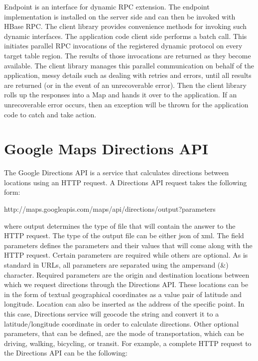 Endpoint is an interface for dynamic RPC extension. The endpoint implementation is installed on the server side and can then be invoked with HBase RPC. 
The client library provides convenience methods for invoking such dynamic interfaces. The application code client side performs a batch call. 
This initiates parallel RPC invocations of the registered dynamic protocol on every target table region. The results of those invocations are returned 
as they become available. The client library manages this parallel communication on behalf of the application, messy details such as dealing with retries 
and errors, until all results are returned (or in the event of an unrecoverable error). Then the client library rolls up the responses into a Map and hands 
it over to the application. If an unrecoverable error occurs, then an exception will be thrown for the application code to catch and take action.


\section{Google Maps Directions API}

The Google Directions API \cite{16} is a service that calculates directions between locations using an HTTP request. A Directions API request takes the following form:
\begin{center}
  http://maps.googleapis.com/maps/api/directions/output?parameters
\end{center}

where output determines the type of file that will contain the answer to the HTTP request. The type of the output file can be either json of xml. 
The field parameters 
defines the parameters and their values that will come along with the HTTP request. Certain parameters are required while others are optional. As is standard 
in URLs, all parameters are separated using the ampersand (\&) character. Required parameters are the origin and destination locations between which we 
request directions through the Directions API. These locations can be in the form of textual geographical coordinates as a value pair of latitude and 
longitude. Location can also be inserted as the address of the specific point. In this case, Directions service will geocode the string and convert it to 
a latitude/longitude coordinate in order to calculate directions. Other optional parameters, that can be defined, are the mode of transportation, 
which can be driving, walking, bicycling, or transit. For example, a complete HTTP request to the Directions API can be the following:

